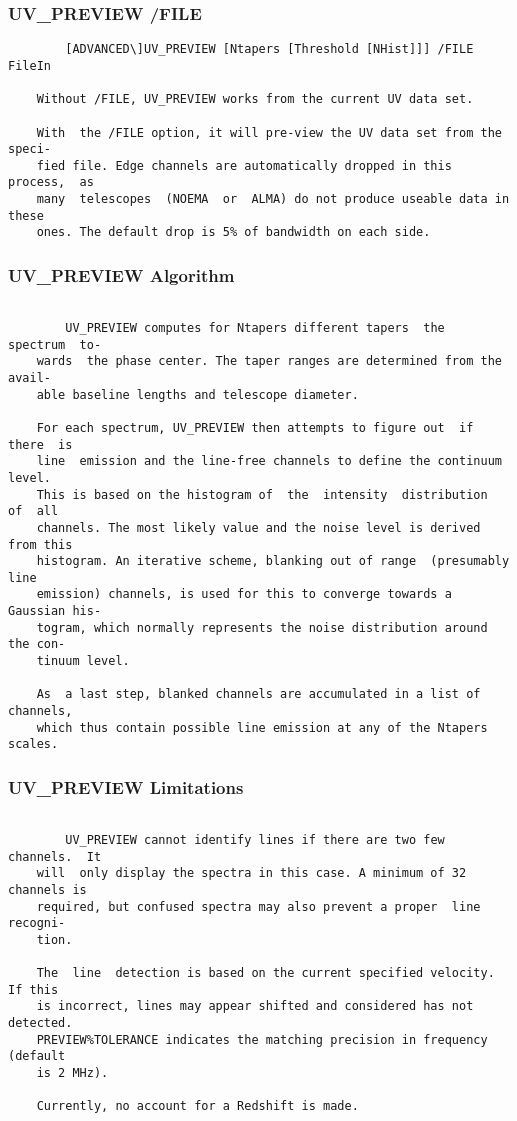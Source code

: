 \subsubsection{UV\_PREVIEW /FILE}
\begin{verbatim}
        [ADVANCED\]UV_PREVIEW [Ntapers [Threshold [NHist]]] /FILE FileIn

    Without /FILE, UV_PREVIEW works from the current UV data set.

    With  the /FILE option, it will pre-view the UV data set from the speci-
    fied file. Edge channels are automatically dropped in this  process,  as
    many  telescopes  (NOEMA  or  ALMA) do not produce useable data in these
    ones. The default drop is 5% of bandwidth on each side.

\end{verbatim}
\subsubsection{UV\_PREVIEW Algorithm}
\begin{verbatim}

        UV_PREVIEW computes for Ntapers different tapers  the  spectrum  to-
    wards  the phase center. The taper ranges are determined from the avail-
    able baseline lengths and telescope diameter.

    For each spectrum, UV_PREVIEW then attempts to figure out  if  there  is
    line  emission and the line-free channels to define the continuum level.
    This is based on the histogram of  the  intensity  distribution  of  all
    channels. The most likely value and the noise level is derived from this
    histogram. An iterative scheme, blanking out of range  (presumably  line
    emission) channels, is used for this to converge towards a Gaussian his-
    togram, which normally represents the noise distribution around the con-
    tinuum level.

    As  a last step, blanked channels are accumulated in a list of channels,
    which thus contain possible line emission at any of the Ntapers scales.

\end{verbatim}
\subsubsection{UV\_PREVIEW Limitations}
\begin{verbatim}

        UV_PREVIEW cannot identify lines if there are two few  channels.  It
    will  only display the spectra in this case. A minimum of 32 channels is
    required, but confused spectra may also prevent a proper  line  recogni-
    tion.

    The  line  detection is based on the current specified velocity. If this
    is incorrect, lines may appear shifted and considered has not  detected.
    PREVIEW%TOLERANCE indicates the matching precision in frequency (default
    is 2 MHz).

    Currently, no account for a Redshift is made.

\end{verbatim}
